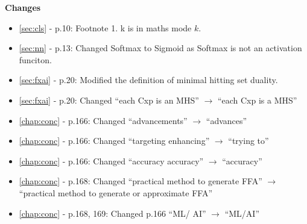 \color{blue}
\textbf{Changes}

\begin{itemize}
	\item \autoref{sec:cls} - p.10: Footnote 1. k is in maths mode $k$. 
	\item \autoref{sec:nn} - p.13: Changed Softmax to Sigmoid as Softmax is not an activation funciton.
	\item \autoref{sec:fxai} - p.20: Modified the definition of minimal hitting set duality.
	\item \autoref{sec:fxai} - p.20: Changed ``each Cxp is an MHS'' $\rightarrow$ ``each Cxp is a MHS''
	\item \autoref{chap:conc} - p.166: Changed ``advancements'' $\rightarrow$ ``advances''
	\item \autoref{chap:conc} - p.166: Changed ``targeting enhancing'' $\rightarrow$ ``trying to''
	\item \autoref{chap:conc} - p.166: Changed ``accuracy accuracy'' $\rightarrow$ ``accuracy'' 
	\item \autoref{chap:conc} - p.168: Changed ``practical method to generate FFA'' $\rightarrow$ ``practical
		method to generate or approximate FFA''
	\item \autoref{chap:conc} - p.168, 169: Changed p.166 ``ML/ AI'' $\rightarrow$ ``ML/AI''
\end{itemize}
